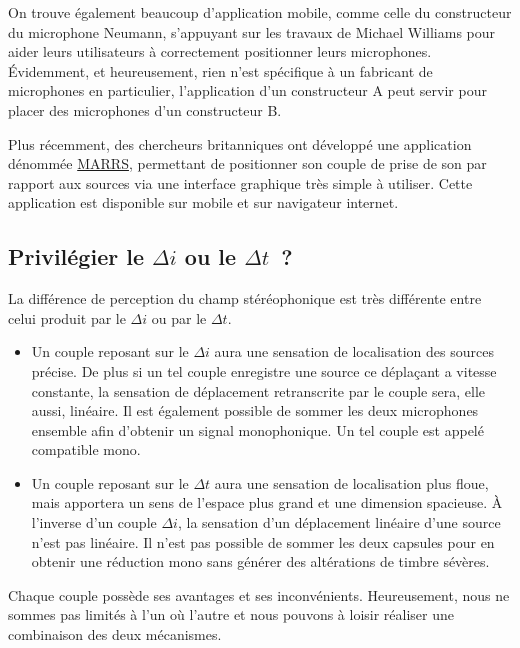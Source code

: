 \documentclass[
]{book}
\providecommand{\tightlist}{%
  \setlength{\itemsep}{0pt}\setlength{\parskip}{0pt}}
\begin{document}
On trouve également beaucoup d'application mobile, comme celle du constructeur du microphone Neumann, s'appuyant sur les travaux de Michael Williams pour aider leurs utilisateurs à correctement positionner leurs microphones. Évidemment, et heureusement, rien n'est spécifique à un fabricant de microphones en particulier, l'application d'un constructeur A peut servir pour placer des microphones d'un constructeur B.

Plus récemment, des chercheurs britanniques ont développé une application dénommée \href{https://marrsweb.hud.ac.uk/}{MARRS}, permettant de positionner son couple de prise de son par rapport aux sources via une interface graphique très simple à utiliser. Cette application est disponible sur mobile et sur navigateur internet.

\hypertarget{priviluxe9gier-le-delta-i-ou-le-delta-t}{%
\subsection{\texorpdfstring{Privilégier le \(\Delta i\) ou le \(\Delta t\)~?}{Privilégier le \textbackslash Delta i ou le \textbackslash Delta t~?}}\label{priviluxe9gier-le-delta-i-ou-le-delta-t}}

La différence de perception du champ stéréophonique est très différente entre celui produit par le \(\Delta i\) ou par le \(\Delta t\).

\begin{itemize}
\tightlist
\item
  Un couple reposant sur le \(\Delta i\) aura une sensation de localisation des sources précise. De plus si un tel couple enregistre une source ce déplaçant a vitesse constante, la sensation de déplacement retranscrite par le couple sera, elle aussi, linéaire. Il est également possible de sommer les deux microphones ensemble afin d'obtenir un signal monophonique. Un tel couple est appelé compatible mono.
\item
  Un couple reposant sur le \(\Delta t\) aura une sensation de localisation plus floue, mais apportera un sens de l'espace plus grand et une dimension spacieuse. À l'inverse d'un couple \(\Delta i\), la sensation d'un déplacement linéaire d'une source n'est pas linéaire. Il n'est pas possible de sommer les deux capsules pour en obtenir une réduction mono sans générer des altérations de timbre sévères.
\end{itemize}

Chaque couple possède ses avantages et ses inconvénients. Heureusement, nous ne sommes pas limités à l'un où l'autre et nous pouvons à loisir réaliser une combinaison des deux mécanismes.
\end{document}

